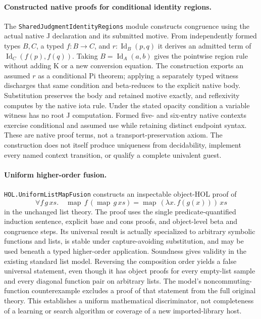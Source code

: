 \documentclass[11pt]{article}
\theoremstyle{definition}
\theoremstyle{remark}
\begin{document}
\paragraph{Constructed native proofs for conditional identity regions.}
The \texttt{SharedJudgment\-IdentityRegions} module constructs congruence using the actual
native J declaration and its submitted motive. From independently formed
types $B,C$, a typed $f:B\to C$, and $r:\operatorname{Id}_B(p,q)$ it derives
an admitted term of $\operatorname{Id}_C(f(p),f(q))$. Taking
$B=\operatorname{Id}_A(a,b)$ gives the pointwise region rule without adding
K or a new conversion equation. The construction exports an assumed $r$ as a
conditional Pi theorem; applying a separately typed witness discharges that
same condition and beta-reduces to the explicit native body. Substitution
preserves the body and retained motive exactly, and reflexivity computes by
the native iota rule. Under the stated opacity condition a variable witness
has no root J computation. Formed five- and six-entry native contexts exercise
conditional and assumed use while retaining distinct endpoint syntax. These
are native proof terms, not a transport-preservation axiom. The construction
does not itself produce uniqueness from decidability, implement every named
context transition, or qualify a complete univalent guest.

\paragraph{Uniform higher-order fusion.}
\texttt{HOL.UniformListMapFusion} constructs an inspectable object-HOL proof
of
\[
  \forall f\,g\,xs.\quad
  \operatorname{map}\,f\,(\operatorname{map}\,g\,xs)
  =\operatorname{map}\,(\lambda x.\,f(g(x)))\,xs
\]
in the unchanged list theory. The proof uses the single predicate-quantified
induction sentence, explicit base and cons proofs, and object-level beta
and congruence steps. Its universal result is actually specialized to
arbitrary symbolic functions and lists, is stable under capture-avoiding
substitution, and may be used beneath a typed higher-order application.
Soundness gives validity in the existing standard list model. Reversing the
composition order yields a false universal statement, even though it has
object proofs for every empty-list sample and every diagonal function pair
on arbitrary lists. The model's noncommuting-function counterexample excludes
a proof of that statement from the full original theory. This establishes a
uniform mathematical discriminator, not completeness of a learning or search
algorithm or coverage of a new imported-library host.
\end{document}
